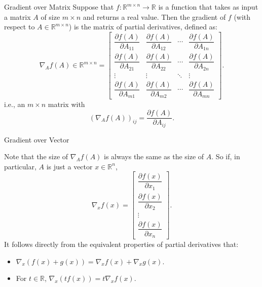 \documentclass[aspectratio=169,12pt]{beamer}
\begin{document}
\begin{frame}[t]{Gradient over Matrix}
  \vspace{-0.12cm}
  {\scriptsize
  Suppose that $f:\mathbb{R}^{m\times n}\to\mathbb{R}$ is a function that takes
  as input a matrix $A$ of size $m\times n$ and returns a real value. Then the
  gradient of $f$ (with respect to $A\in\mathbb{R}^{m\times n}$) is the matrix of
  partial derivatives, defined as:
  \[
    \nabla_A f(A)\in\mathbb{R}^{m\times n}
    =\begin{bmatrix}
      \dfrac{\partial f(A)}{\partial A_{11}}&
      \dfrac{\partial f(A)}{\partial A_{12}}&\cdots&
      \dfrac{\partial f(A)}{\partial A_{1n}}\\[0.55em]
      \dfrac{\partial f(A)}{\partial A_{21}}&
      \dfrac{\partial f(A)}{\partial A_{22}}&\cdots&
      \dfrac{\partial f(A)}{\partial A_{2n}}\\
      \vdots&\vdots&\ddots&\vdots\\[0.20em]
      \dfrac{\partial f(A)}{\partial A_{m1}}&
      \dfrac{\partial f(A)}{\partial A_{m2}}&\cdots&
      \dfrac{\partial f(A)}{\partial A_{mn}}
    \end{bmatrix}.
  \]
  i.e., an $m\times n$ matrix with
  \[
    (\nabla_A f(A))_{ij}=\frac{\partial f(A)}{\partial A_{ij}}.
  \]
  }
\end{frame}

\begin{frame}[t]{Gradient over Vector}
  \vspace{-0.02cm}
  {\scriptsize
  Note that the size of $\nabla_A f(A)$ is always the same as the size of $A$.
  So if, in particular, $A$ is just a vector $x\in\mathbb{R}^{n}$,
  \[
    \nabla_x f(x)=
    \begin{bmatrix}
      \dfrac{\partial f(x)}{\partial x_1}\\[0.45em]
      \dfrac{\partial f(x)}{\partial x_2}\\
      \vdots\\[0.20em]
      \dfrac{\partial f(x)}{\partial x_n}
    \end{bmatrix}.
  \]
  It follows directly from the equivalent properties of partial derivatives that:
  \begin{itemize}
    \setlength{\itemsep}{0.10cm}
    \item $\nabla_x(f(x)+g(x))=\nabla_x f(x)+\nabla_x g(x)$.
    \item For $t\in\mathbb{R}$, $\nabla_x(tf(x))=t\nabla_x f(x)$.
  \end{itemize}
  }
\end{frame}
\end{document}

